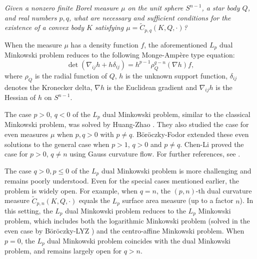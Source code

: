 \documentclass[12pt, reqno]{amsart}
\theoremstyle{definition}
\theoremstyle{remark}
\numberwithin{equation}{section}
\newcommand{\Sn}{S^{n-1}}
\newcommand{\Lp}{L_{p}}
\begin{document}
	    \textit{Given a nonzero finite Borel measure $\mu$ on the unit sphere $S^{n-1}$, a star body $Q$, and real numbers $p,q$, what are necessary and sufficient conditions  for the existence of a convex body $K$ satisfying 
	    	$\mu = \widetilde{C}_{p,q}(K, Q, \cdot)$?}
	  
	  When the  measure $\mu$ has a density function $f$, the aforementioned $L_p$ dual Minkowski problem reduces to the following Monge-Amp\`{e}re type equation:
	  \begin{equation}\label{continuous}
	  	\det(\nabla_{ij} h + h \delta_{ij}) = h^{p-1} \rho_{Q}^{q-n}(\nabla h) f,
	  \end{equation}
	  where $\rho_{Q}$ is the radial function of $Q$, $h$ is the unknown support function, $\delta_{ij}$ denotes the Kronecker delta, $\nabla h$ is the Euclidean gradient and $\nabla_{ij}h$ is the Hessian of $h$ on $S^{n-1}$.
	  
	  
	   
	  
	  
	   The case $p > 0$, $q < 0$ of the $\Lp$ dual Minkowski problem,   similar to the classical Minkowski problem, was solved by Huang-Zhao \cite{huangzhao dual}. They also studied the case for even measures $\mu$ when $p, q > 0$ with $p \neq q$.   B\"or\"oczky-Fodor \cite{BF2019} extended these even solutions to the general case when $p > 1$, $q > 0$ and $p \neq q$.  Chen-Li \cite{chenli flow} proved the case for $p > 0$, $q \neq n$ using  Gauss curvature flow.  
	   For further references,  see \cite{ai lpdual,liwan2025,LLL2022,LP2021,mui2022}.
	  
	  
	  The case $ q>0, p\le0$  of the $\Lp$ dual Minkowski problem is more challenging and remains poorly understood. 
	  Even for the special cases mentioned earlier, the problem is widely open. For example, when $q=n$, the $(p, n)$-th dual curvature measure $\widetilde{C}_{p,n}(K, Q, \cdot)$ equals the $\Lp$ surface area measure (up to a factor $n$). In this setting, the $\Lp$ dual Minkowski problem reduces to the $\Lp$ Minkowski problem, which includes both the  logarithmic Minkowski problem (solved in the even case by B\"or\"oczky-LYZ \cite{KLYZ2013JAMS}) and the centro-affine Minkowski problem. 
	  When $p=0$, the $\Lp$ dual Minkowski problem coincides with the dual Minkowski problem, and remains largely open for $q > n$.
	  
\end{document}
